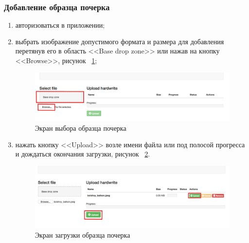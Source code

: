 \subsubsection{Добавление образца почерка}
\label{sec:manpage:client_man:add_sample}
\begin{enumerate}
    \item авторизоваться в приложении;
    \item выбрать изображение допустимого формата и размера для добавления перетянув его в область <<Base drop zone>> или нажав на кнопку <<Browse>>, рисунок ~\ref{fig:manpage:client_man:add_sample};
        \begin{figure}[ht]
            \centering
            \includegraphics[width=0.6\textheight]{figures/select_sample_man.png}
            \caption{Экран выбора образца почерка}
            \label{fig:manpage:client_man:add_sample}
        \end{figure}
    \item нажать кнопку <<Upload>> возле имени файла или под полосой прогресса и дождаться окончания загрузки, рисунок ~\ref{fig:manpage:client_man:upload_sample}.
        \begin{figure}[ht]
            \centering
            \includegraphics[width=0.6\textheight]{figures/upload_sample_man.png}
            \caption{Экран загрузки образца почерка}
            \label{fig:manpage:client_man:upload_sample}
        \end{figure}
\end{enumerate}

